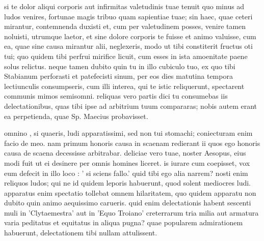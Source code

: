 


 si te dolor aliqui corporis aut infirmitas valetudinis tuae tenuit quo minus ad ludos venires, fortunae magis tribuo quam sapientiae tuae; sin haec, quae ceteri mirantur, contemnenda duxisti et, cum per valetudinem posses, venire tamen noluisti, utrumque laetor, et sine dolore corporis te fuisse et animo valuisse, cum ea, quae sine causa mirantur alii, neglexeris, modo ut tibi constiterit fructus oti tui; quo quidem tibi perfrui mirifice licuit, cum esses in ista amoenitate paene solus relictus. neque tamen dubito quin tu in illo cubiculo tuo, ex quo tibi Stabianum perforasti et patefecisti sinum, per eos dies matutina tempora lectiunculis consumpseris, cum illi interea, qui te istic reliquerunt, spectarent communis mimos semisomni. reliquas vero partis dici tu consumebas iis delectationibus, quas tibi ipse ad arbitrium tuum compararas; nobis autem erant ea perpetienda, quae Sp. Maecius probavisset.

 omnino , si quaeris, ludi apparatissimi, sed non tui stomachi; coniecturam enim facio de meo. nam primum honoris causa in scaenam redierant ii quos ego honoris causa de scaena decessisse arbitrabar. deliciae vero tuae, noster Aesopus, eius modi fuit ut ei desinere per omnis homines liceret. is iurare cum coepisset, vox eum defecit in illo loco : ' si sciens fallo.' quid tibi ego alia narrem? nosti enim reliquos ludos; qui ne id quidem leporis habuerunt, quod solent mediocres ludi. apparatus enim spectatio tollebat omnem hilaritatem, quo quidem apparatu non dubito quin animo aequissimo carueris. quid enim delectationis habent sescenti muli in 'Clytaemestra' aut in 'Equo Troiano' creterrarum tria milia aut armatura varia peditatus et equitatus in aliqua pugna? quae popularem admirationem habuerunt, delectationem tibi nullam attulissent.

